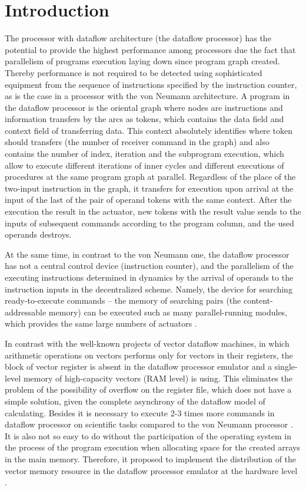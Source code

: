\documentclass[
11pt,%
tightenlines,%
twoside,%
onecolumn,%
nofloats,%
nobibnotes,%
nofootinbib,%
superscriptaddress,%
noshowpacs,%
centertags]%
{revtex4}
\begin{document}
\section{Introduction}

The processor with dataflow architecture (the dataflow processor) has the potential to provide the highest performance among processors due the fact that parallelism of programs execution laying down since program graph created. Thereby performance is not required to be detected using sophisticated equipment from the sequence of instructions specified by the instruction counter, as is the case in a processor with the von Neumann architecture. A program in the dataflow processor is the oriental graph where nodes are instructions and information transfers by the arcs as tokens, which contains the data field and context field of transferring data. This context absolutely identifies where token should transfers (the number of receiver command in the graph) and also contains the number of index, iteration and the subprogram execution, which allow to execute different iterations of inner cycles and different executions of procedures at the same program graph at parallel. Regardless of the place of the two-input instruction in the graph, it transfers for execution upon arrival at the input of the last of the pair of operand tokens with the same context. After the execution the result in the actuator, new tokens with the result value sends to the inputs of subsequent commands according to the program column, and the used operands destroys.

At the same time, in contrast to the von Neumann one, the dataflow processor has not a central control device (instruction counter), and the parallelism of the executing instructions determined in dynamics by the arrival of operands to the instruction inputs in the decentralized scheme. Namely, the device for searching ready-to-execute commands -- the memory of searching pairs (the content-addressable memory) can be executed such as many parallel-running modules, which provides the same large numbers of actuators \cite{fine-grained-prl}.


In contrast with the well-known projects of vector dataflow machines, in which arithmetic operations on vectors performs only for vectors in their registers, the block of vector register is absent in the dataflow processor emulator and a single-level memory of high-capacity vectors (RAM level) is using. This eliminates the problem of the possibility of overflow on the register file, which does not have a simple solution, given the complete asynchrony of the dataflow model of calculating. Besides it is necessary to execute 2-3 times more commands in dataflow processor on scientific tasks compared to the von Neumann processor \cite{multithreading}. It is also not so easy to do without the participation of the operating system in the process of the program execution when allocating space for the created arrays in the main memory. Therefore, it proposed to implement the distribution of the vector memory resource in the dataflow processor emulator at the hardware level \cite{vpp}.
\end{document}
